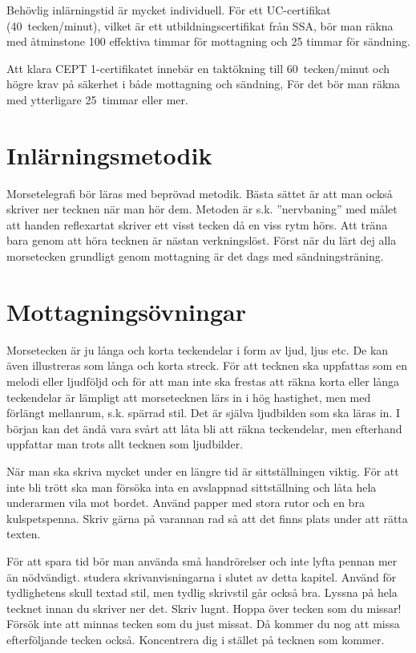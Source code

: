 Behövlig inlärningstid är mycket individuell.
För ett UC-certifikat (40~tecken/minut), vilket är ett utbildningscertifikat
från SSA, bör man räkna med åtminstone 100 effektiva timmar för mottagning
och 25 timmar för sändning.

Att klara CEPT 1-certifikatet innebär en taktökning till 60~tecken/minut och
högre krav på säkerhet i både mottagning och sändning, För det bör man räkna med
ytterligare 25~timmar eller mer.

\section{Inlärningsmetodik}

Morsetelegrafi bör läras med beprövad metodik. Bästa sättet är att man också
skriver ner tecknen när man hör dem. Metoden är s.k. ''nervbaning'' med målet att
handen reflexartat skriver ett visst tecken då en viss rytm hörs. Att träna bara
genom att höra tecknen är nästan verkningslöst. Först när du lärt dej alla
morsetecken grundligt genom mottagning är det dags med sändningsträning.

\section{Mottagnings\-övningar}

Morsetecken är ju långa och korta teckendelar i form av ljud, ljus etc. De kan
även illustreras som långa och korta streck. För att tecknen ska uppfattas som
en melodi eller ljudföljd och för att man inte ska frestas att räkna korta
eller långa teckendelar är lämpligt att morsetecknen lärs in i hög hastighet,
men med förlängt mellanrum, s.k. spärrad stil. Det är själva ljudbilden som
ska läras in. I början kan det ändå vara svårt att låta bli att räkna
teckendelar, men efterhand uppfattar man trots allt tecknen som ljudbilder.

När man ska skriva mycket under en längre tid är sittställningen viktig. För
att inte bli trött ska man försöka inta en avslappnad sittställning och låta
hela underarmen vila mot bordet. Använd papper med stora rutor och en bra
kulspetspenna. Skriv gärna på varannan rad så att det finns plats under att
rätta texten.

För att spara tid bör man använda små handrörelser och inte lyfta pennan mer än
nödvändigt. studera skrivanvisningarna i slutet av detta kapitel. Använd för
tydlighetens skull textad stil, men tydlig skrivstil går också bra. Lyssna på
hela tecknet innan du skriver ner det. Skriv lugnt. Hoppa över tecken som du
missar! Försök inte att minnas tecken som du just missat. Då kommer du nog att
missa efterföljande tecken också. Koncentrera dig i stället på tecknen som
kommer.

